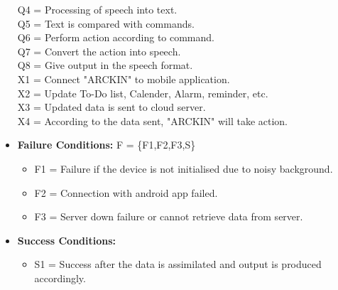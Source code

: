 \documentclass[16pt,oneside,a4paper]{article}
\begin{document}
\begin{itemize}
    Q4 = Processing of speech into text.\\
    \newline 
    Q5 = Text is compared with commands.\\
    \newline
    Q6 = Perform action according to command.\\
    \newline 
    Q7 = Convert the action into speech.\\
    \newline 
    Q8 = Give output in the speech format.\\
    \newline
    X1 = Connect "ARCKIN" to mobile application.\\
    \newline
    X2 = Update To-Do list, Calender, Alarm, reminder, etc.\\
    \newline
    X3 = Updated data is sent to cloud server.\\
    \newline
    X4 = According to the data sent, "ARCKIN" will take action.\\
    \newline
    
\item \textbf{Failure Conditions:}  F = \{F1,F2,F3,S\} \newline
\begin{itemize}
\item F1  = Failure if the device is not initialised due to noisy background.
\item F2 = Connection with android app failed.
\item F3 = Server down failure or cannot retrieve data from server.
\end{itemize}

\item \textbf{Success Conditions:}
    \begin{itemize}
    		\item S1 = Success after the data is assimilated and output is produced accordingly.
	\end{itemize}     


\end{itemize}
\end{document}
